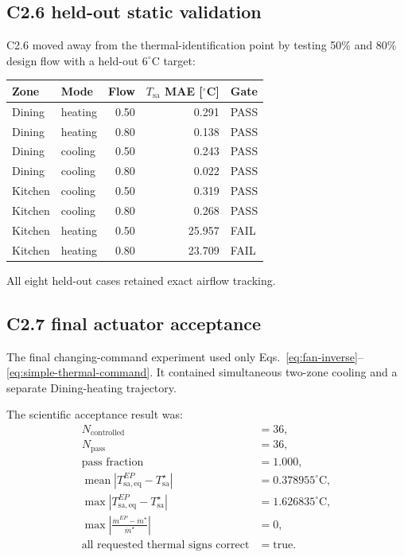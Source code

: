\documentclass[11pt]{article}
\newcommand{\mdot}{\dot m}
\begin{document}
\subsection{C2.6 held-out static validation}

C2.6 moved away from the thermal-identification point by testing 50\% and 80\%
design flow with a held-out $6^\circ$C target:
\begin{center}
\begin{tabular}{llrrl}
\toprule
Zone & Mode & Flow & $T_{\mathrm{sa}}$ MAE [$^\circ$C] & Gate \\
\midrule
Dining & heating & 0.50 & 0.291 & PASS \\
Dining & heating & 0.80 & 0.138 & PASS \\
Dining & cooling & 0.50 & 0.243 & PASS \\
Dining & cooling & 0.80 & 0.022 & PASS \\
Kitchen & cooling & 0.50 & 0.319 & PASS \\
Kitchen & cooling & 0.80 & 0.268 & PASS \\
Kitchen & heating & 0.50 & 25.957 & FAIL \\
Kitchen & heating & 0.80 & 23.709 & FAIL \\
\bottomrule
\end{tabular}
\end{center}
All eight held-out cases retained exact airflow tracking.

\subsection{C2.7 final actuator acceptance}

The final changing-command experiment used only
Eqs.~\eqref{eq:fan-inverse}--\eqref{eq:simple-thermal-command}.  It contained
simultaneous two-zone cooling and a separate Dining-heating trajectory.

The scientific acceptance result was:
\begin{align}
N_{\mathrm{controlled}}
&=36,\\
N_{\mathrm{pass}}
&=36,\\
\text{pass fraction}
&=1.000,\\
\operatorname{mean}
\left|
T_{\mathrm{sa,eq}}^{EP}
-
T_{\mathrm{sa}}^\star
\right|
&=
0.378955^\circ\mathrm C,\\
\max
\left|
T_{\mathrm{sa,eq}}^{EP}
-
T_{\mathrm{sa}}^\star
\right|
&=
1.626835^\circ\mathrm C,\\
\max
\left|
\frac{
\mdot^{EP}-\mdot^\star
}{
\mdot^\star
}
\right|
&=
0,\\
\text{all requested thermal signs correct}
&=
\mathrm{true}.
\end{align}
\end{document}
